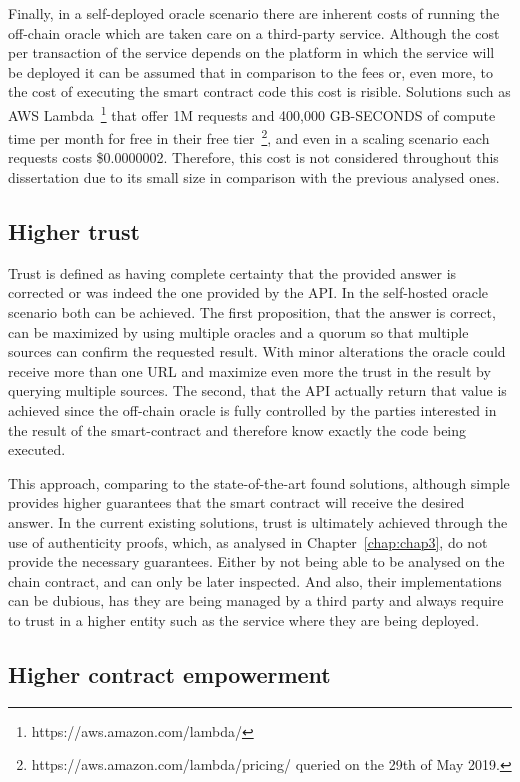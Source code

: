 Finally, in a self-deployed oracle scenario there are inherent costs of running the off-chain oracle which are taken care on a third-party service. Although the cost per transaction of the service depends on the platform in which the service will be deployed it can be assumed that in comparison to the fees or, even more, to the cost of executing the smart contract code this cost is risible. Solutions such as AWS Lambda~\footnote{https://aws.amazon.com/lambda/} that offer 1M requests and 400,000 GB-SECONDS of compute time per month for free in their free tier~\footnote{https://aws.amazon.com/lambda/pricing/ queried on the 29th of May 2019.}, and even in a scaling scenario each requests costs \$0.0000002. Therefore, this cost is not considered throughout this dissertation due to its small size in comparison with the previous analysed ones.

\subsection{Higher trust}

Trust is defined as having complete certainty that the provided answer is corrected or was indeed the one provided by the API. In the self-hosted oracle scenario both can be achieved. The first proposition, that the answer is correct, can be maximized by using multiple oracles and a quorum so that multiple sources can confirm the requested result. With minor alterations the oracle could receive more than one URL and maximize even more the trust in the result by querying multiple sources. The second, that the API actually return that value is achieved since the off-chain oracle is fully controlled by the parties interested in the result of the smart-contract and therefore know exactly the code being executed.

This approach, comparing to the state-of-the-art found solutions, although simple provides higher guarantees that the smart contract will receive the desired answer. In the current existing solutions, trust is ultimately achieved through the use of authenticity proofs, which, as analysed in Chapter~\ref{chap:chap3}, do not provide the necessary guarantees. Either by not being able to be analysed on the chain contract, and can only be later inspected. And also, their implementations can be dubious, has they are being managed by a third party and always require to trust in a higher entity such as the service where they are being deployed.

\subsection{Higher contract empowerment}

